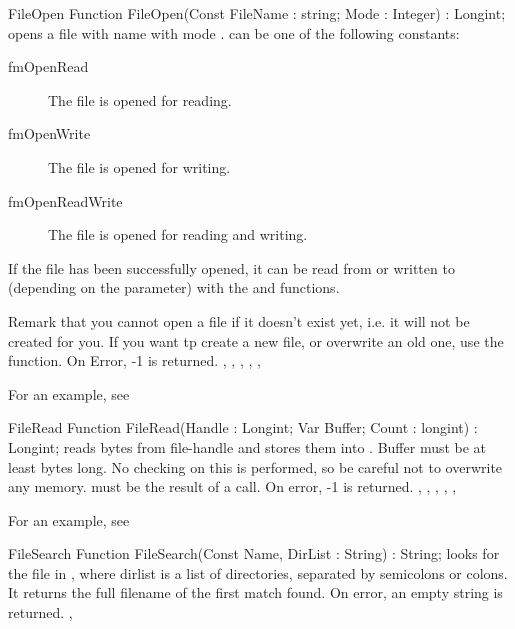  
\begin{function}{FileOpen}
\Declaration
Function FileOpen(Const FileName : string; Mode : Integer) : Longint;
\Description
{} opens a file with name  with mode .
 can be one of the following constants:
\begin{description}
\item[fmOpenRead] The file is opened for reading.
\item[fmOpenWrite] The file is opened for writing.
\item[fmOpenReadWrite] The file is opened for reading and writing.
\end{description}
If the file has been successfully opened, it can be read  from or written to
(depending on the  parameter) with the  and
 functions.

Remark that you cannot open a file if it doesn't exist yet, i.e. it will not
be created for you. If you want tp create a new file, or overwrite an old
one, use the  function.
\Errors
On Error, -1 is returned.
\SeeAlso
{}, , , ,
, 
\end{function}

For an example, see 
 
\begin{function}{FileRead}
\Declaration
Function FileRead(Handle : Longint; Var Buffer; Count : longint) : Longint;
\Description
{} reads  bytes from file-handle  and
stores them into . Buffer must be at least  bytes
long. No checking on this is performed, so be careful not to overwrite any
memory.   must be the result of a  call.
\Errors
On error, -1 is returned.
\SeeAlso
{}, , , ,
, 
\end{function}

For an example, see 

\begin{function}{FileSearch}
\Declaration
Function FileSearch(Const Name, DirList : String) : String;
\Description
{} looks for the file  in , where
dirlist is a list of directories, separated by semicolons or colons.
It returns the full filename of the first match found.
\Errors
On error, an empty string is returned.
\SeeAlso
{}, 
\end{function}

